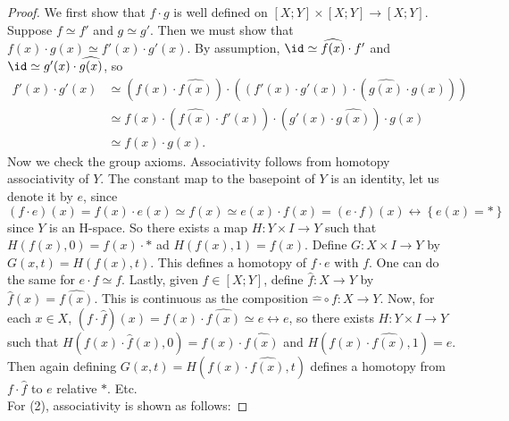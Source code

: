 \begin{proof}
    We first show that $f\cdot g$ is well defined
    on $\left[ X;Y \right] \times \left[ X;Y \right] 
    \to \left[ X;Y \right] $.
    Suppose $f \simeq f'$ and $g \simeq g'$.
    Then we must show that
    $f(x) \cdot g(x) \simeq f'(x) \cdot g'(x)$.
    By assumption,
    $\id \simeq \widehat{f(x)}\cdot  f'$ and
    $\id \simeq g'(x) \cdot \widehat{g(x)}$, so
    \begin{align*}
        f'(x) \cdot g'(x)
        &\simeq \left( f(x) \cdot \widehat{f(x)} \right) 
        \cdot \left( \left( f'(x) \cdot g'(x) \right) \cdot 
        \left( \widehat{g(x)} \cdot g(x) \right) \right)\\
        &\simeq f(x) \cdot \left( \widehat{f(x)}\cdot 
        f'(x) \right) \cdot \left( g'(x) \cdot 
        \widehat{g(x)} \right) \cdot g(x)\\
        &\simeq f(x) \cdot g(x).
    \end{align*}
    Now we check the group axioms.
    Associativity follows from
    homotopy associativity of $Y$. 
    The constant map to the basepoint
     of $Y$ is an identity, let us denote it by
     $e$, since
     $\left( f \cdot e \right) (x) 
     = f(x) \cdot e(x) \simeq
     f(x) \simeq e(x) \cdot f(x) 
     = \left( e\cdot f \right) (x) \rel
     \left\{ e(x)=* \right\}$ since $Y$ is an
     H-space. So there
     exists a map $H \colon Y \times I \to Y$ such that
     $H(f(x),0) = f(x) \cdot *$ ad
     $H\left( f(x), 1 \right) = f(x)$.
     Define $G \colon X \times I \to Y$ by
     $G(x,t) = H\left( f(x),t \right) $.
     This defines a homotopy
     of $f\cdot e$ with $f$.
     One can do the same for $e\cdot f \simeq f$.
     Lastly, given $f \in \left[ X;Y \right] $, 
     define $\widehat{f} \colon X \to Y$ by
     $\widehat{f}(x) = \widehat{f(x)}$. This
     is continuous as the composition
     $\widehat{-} \circ f \colon X \to Y$. 
     Now, for each $x \in X$,
     $\left( f\cdot \widehat{f} \right) (x)
     = f(x) \cdot \widehat{f(x)}
     \simeq e \rel{e}$, so
     there exists $H \colon Y \times I \to Y$ such that
     $H\left( f\left( x \right) \cdot \widehat{f}(x),
     0 \right) = f(x) \cdot \widehat{f(x)}$ and
     $H\left( f(x) \cdot \widehat{f(x)},1 \right) 
     = e$. Then again defining
     $G(x,t) = H\left( f(x)\cdot \widehat{f(x)},t \right) $ 
     defines a homotopy from
     $f \cdot \widehat{f}$ to $e$ relative
     $*$. Etc.\\
     \linebreak
     For (2), associativity is shown as follows:

\end{proof}
